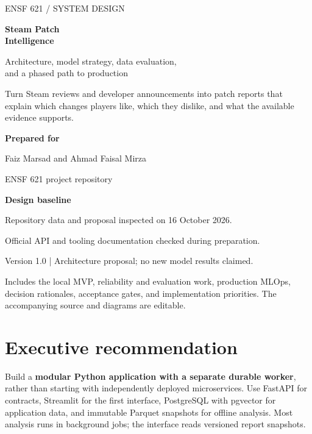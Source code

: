 \documentclass[10pt,letterpaper]{article}
\newcommand{\key}[1]{\textbf{\color{ink}#1}}
\newenvironment{decision}{\begin{tcolorbox}[colback=pale,colframe=teal,boxrule=0.5pt,arc=2pt,left=9pt,right=9pt,top=6pt,bottom=6pt]}{\end{tcolorbox}}
\begin{document}
\begin{titlepage}
\vspace*{0.7in}
{\color{teal}\large ENSF 621 \quad / \quad SYSTEM DESIGN}\par
\vspace{0.3in}
{\fontsize{35}{40}\selectfont\bfseries\color{ink}Steam Patch\\Intelligence}\par
\vspace{0.25in}
{\Large Architecture, model strategy, data evaluation,\\and a phased path to production}\par
\vspace{0.5in}
\begin{decision}
\large Turn Steam reviews and developer announcements into patch reports that explain which changes players like, which they dislike, and what the available evidence supports.
\end{decision}
\vspace{0.35in}
\key{Prepared for}\par
Faiz Marsad and Ahmad Faisal Mirza\par
ENSF 621 project repository\par
\vspace{0.2in}
\key{Design baseline}\par
Repository data and proposal inspected on 16 October 2026.\par
Official API and tooling documentation checked during preparation.\par
Version 1.0 \quad | \quad Architecture proposal; no new model results claimed.\par
\vfill
{\color{muted}Includes the local MVP, reliability and evaluation work, production MLOps, decision rationales, acceptance gates, and implementation priorities. The accompanying source and diagrams are editable.}
\end{titlepage}

\section*{Executive recommendation}
Build a \key{modular Python application with a separate durable worker}, rather than starting with independently deployed microservices. Use FastAPI for contracts, Streamlit for the first interface, PostgreSQL with pgvector for application data, and immutable Parquet snapshots for offline analysis. Most analysis runs in background jobs; the interface reads versioned report snapshots.
\end{document}

